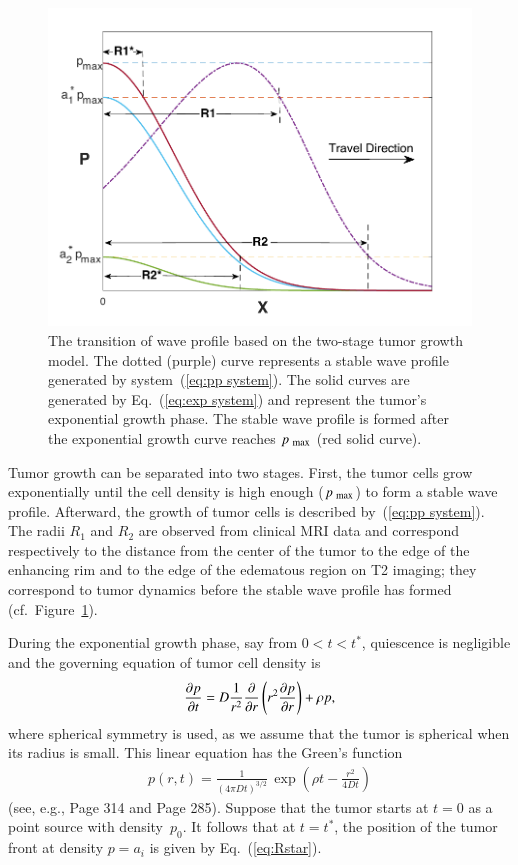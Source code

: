 \documentclass{aims}
\numberwithin{equation}{section}
\begin{document}
\begin{figure}
\begin{center}
\includegraphics[scale=0.90]{plots/wave-edited.pdf}
\end{center}
\caption{The transition of wave profile based on the two-stage tumor growth model. The
dotted (purple) curve represents a stable wave profile generated by
system~(\ref{eq:pp system}). The solid curves are generated by Eq.~(\ref{eq:exp system})
and represent the tumor's exponential growth phase.
The stable wave profile is formed after the exponential growth curve reaches
$p_{\mbox{\scriptsize max}}$ (red solid curve).}
\label{fig:wave}
\end{figure}

Tumor growth can be separated into two stages. First, the tumor cells grow exponentially
until the cell density is high enough ($p_{\mbox{\scriptsize max}}$) to form 
a stable wave profile. Afterward, the growth of tumor cells is described
by~(\ref{eq:pp system}).
The radii $R_1$ and $R_2$ are observed from clinical MRI data and correspond respectively
to the
distance from the center of the tumor to the edge of the enhancing rim and to the edge
of the edematous region on T2 imaging; they correspond to tumor dynamics
before the stable wave profile has formed (cf.\ Figure~\ref{fig:wave}). 

During the exponential growth phase, say from $0<t<t^*$, quiescence is negligible and the governing equation of tumor cell density is 
\begin{eqnarray}\label{eq:exp system}
\frac{\partial p}{\partial t} =  D\frac{1}{r^2} \frac{\partial}{\partial r} \left(r^2 \frac{\partial p}{\partial r}\right) + \rho p,
\end{eqnarray}
where spherical symmetry is used, as we assume that the tumor is spherical when
its radius is small.
This linear equation has the Green's function 
\begin{eqnarray}
p(r,t)=\frac{1}{(4 \pi D t)^{3/2}}\, \exp\left(\rho t - \frac{r^2}{4Dt}\right) 
\end{eqnarray}
(see, e.g., \cite{KotBook} Page 314 and \cite{BrittonBook} Page 285).
Suppose that the tumor starts at $t=0$ as a point source with density~$p_0$.
It follows that at $t=t^*$, the position of the tumor front at density $p=a_i$  is 
given by Eq.~(\ref{eq:Rstar}). 
\end{document}
